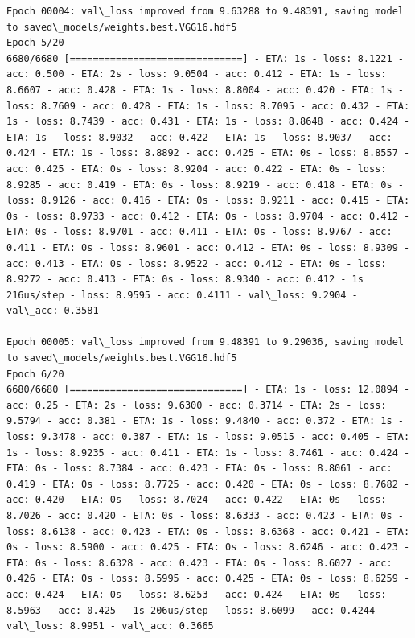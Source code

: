 \documentclass[11pt]{article}
\begin{document}
\begin{Verbatim}[commandchars=\\\{\}]
Epoch 00004: val\_loss improved from 9.63288 to 9.48391, saving model to saved\_models/weights.best.VGG16.hdf5
Epoch 5/20
6680/6680 [==============================] - ETA: 1s - loss: 8.1221 - acc: 0.500 - ETA: 2s - loss: 9.0504 - acc: 0.412 - ETA: 1s - loss: 8.6607 - acc: 0.428 - ETA: 1s - loss: 8.8004 - acc: 0.420 - ETA: 1s - loss: 8.7609 - acc: 0.428 - ETA: 1s - loss: 8.7095 - acc: 0.432 - ETA: 1s - loss: 8.7439 - acc: 0.431 - ETA: 1s - loss: 8.8648 - acc: 0.424 - ETA: 1s - loss: 8.9032 - acc: 0.422 - ETA: 1s - loss: 8.9037 - acc: 0.424 - ETA: 1s - loss: 8.8892 - acc: 0.425 - ETA: 0s - loss: 8.8557 - acc: 0.425 - ETA: 0s - loss: 8.9204 - acc: 0.422 - ETA: 0s - loss: 8.9285 - acc: 0.419 - ETA: 0s - loss: 8.9219 - acc: 0.418 - ETA: 0s - loss: 8.9126 - acc: 0.416 - ETA: 0s - loss: 8.9211 - acc: 0.415 - ETA: 0s - loss: 8.9733 - acc: 0.412 - ETA: 0s - loss: 8.9704 - acc: 0.412 - ETA: 0s - loss: 8.9701 - acc: 0.411 - ETA: 0s - loss: 8.9767 - acc: 0.411 - ETA: 0s - loss: 8.9601 - acc: 0.412 - ETA: 0s - loss: 8.9309 - acc: 0.413 - ETA: 0s - loss: 8.9522 - acc: 0.412 - ETA: 0s - loss: 8.9272 - acc: 0.413 - ETA: 0s - loss: 8.9340 - acc: 0.412 - 1s 216us/step - loss: 8.9595 - acc: 0.4111 - val\_loss: 9.2904 - val\_acc: 0.3581

Epoch 00005: val\_loss improved from 9.48391 to 9.29036, saving model to saved\_models/weights.best.VGG16.hdf5
Epoch 6/20
6680/6680 [==============================] - ETA: 1s - loss: 12.0894 - acc: 0.25 - ETA: 2s - loss: 9.6300 - acc: 0.3714 - ETA: 2s - loss: 9.5794 - acc: 0.381 - ETA: 1s - loss: 9.4840 - acc: 0.372 - ETA: 1s - loss: 9.3478 - acc: 0.387 - ETA: 1s - loss: 9.0515 - acc: 0.405 - ETA: 1s - loss: 8.9235 - acc: 0.411 - ETA: 1s - loss: 8.7461 - acc: 0.424 - ETA: 0s - loss: 8.7384 - acc: 0.423 - ETA: 0s - loss: 8.8061 - acc: 0.419 - ETA: 0s - loss: 8.7725 - acc: 0.420 - ETA: 0s - loss: 8.7682 - acc: 0.420 - ETA: 0s - loss: 8.7024 - acc: 0.422 - ETA: 0s - loss: 8.7026 - acc: 0.420 - ETA: 0s - loss: 8.6333 - acc: 0.423 - ETA: 0s - loss: 8.6138 - acc: 0.423 - ETA: 0s - loss: 8.6368 - acc: 0.421 - ETA: 0s - loss: 8.5900 - acc: 0.425 - ETA: 0s - loss: 8.6246 - acc: 0.423 - ETA: 0s - loss: 8.6328 - acc: 0.423 - ETA: 0s - loss: 8.6027 - acc: 0.426 - ETA: 0s - loss: 8.5995 - acc: 0.425 - ETA: 0s - loss: 8.6259 - acc: 0.424 - ETA: 0s - loss: 8.6253 - acc: 0.424 - ETA: 0s - loss: 8.5963 - acc: 0.425 - 1s 206us/step - loss: 8.6099 - acc: 0.4244 - val\_loss: 8.9951 - val\_acc: 0.3665


\end{Verbatim}
\end{document}
